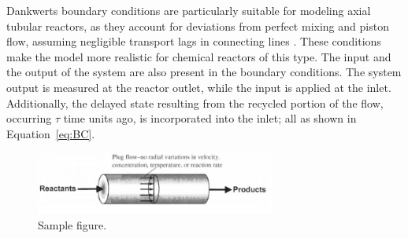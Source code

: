 Dankwerts boundary conditions are particularly suitable for modeling axial tubular reactors, as they account for deviations from perfect mixing and piston flow, assuming negligible transport lags in connecting lines \autocite{danckwerts1993continuous}. These conditions make the model more realistic for chemical reactors of this type. The input and the output of the system are also present in the boundary conditions. The system output is measured at the reactor outlet, while the input is applied at the inlet. Additionally, the delayed state resulting from the recycled portion of the flow, occurring $\tau$ time units ago, is incorporated into the inlet; all as shown in Equation~\ref{eq:BC}.


\begin{figure}[ht]
    \centering
    \includegraphics[width=0.7\textwidth]{Figures/sample.jpeg}
    \caption{Sample figure.}
    \label{fig:reactor_scheme}
\end{figure}

